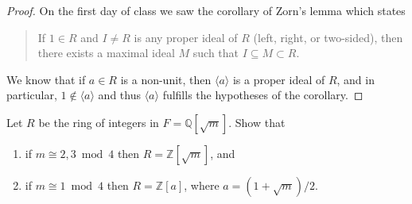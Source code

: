 \documentclass{article}
\newenvironment{problem}[2][Problem]{\begin{trivlist}
\item[\hskip \labelsep {\bfseries #1}\hskip \labelsep {\bfseries #2.}]}{\end{trivlist}}
\newcommand{\ang}[1]{\langle #1 \rangle}
\begin{document}
\begin{proof}
  On the first day of class we saw the corollary of Zorn's lemma which states
  \begin{quote}
    If $1 \in R$ and $I \neq R$ is any proper ideal of $R$
    (left, right, or two-sided), then there exists a maximal ideal $M$ such that
    $I \subseteq M \subset R$.
  \end{quote}
  We know that if $a \in R$ is a non-unit, then $\ang a$ is a proper ideal of
  $R$, and in particular, $1 \not\in \ang a$ and thus $\ang a$ fulfills the
  hypotheses of the corollary.
\end{proof}
\pagebreak
\begin{problem}{8}
  Let $R$ be the ring of integers in $F = \mathbb Q[\sqrt m]$.
  Show that \begin{enumerate}
    \item if $m \cong 2, 3 \bmod 4$ then $R = \mathbb Z[\sqrt m]$, and
    \item if $m \cong 1 \bmod 4$ then $R = \mathbb Z[a]$, where
      $a = (1 + \sqrt m)/2$.
  \end{enumerate}
\end{problem}
\end{document}
